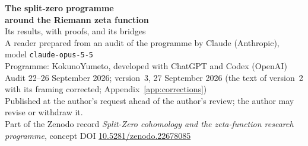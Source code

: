 \documentclass[11pt,a4paper]{article}
\theoremstyle{plain}
\theoremstyle{definition}
\theoremstyle{remark}
\begin{document}
\thispagestyle{plain}
\begin{center}
{\LARGE\bfseries The split-zero programme\\[2pt] around the Riemann zeta function}\\[8pt]
{\Large Its results, with proofs, and its bridges}\\[14pt]
{\large A reader prepared from an audit of the programme by Claude (Anthropic),\\ model \texttt{claude-opus-5-5}}\\[8pt]
{\normalsize Programme: KokunoYumeto, developed with ChatGPT and Codex (OpenAI)}\\[4pt]
{\normalsize Audit 22--26 September 2026; version~3, 27 September 2026 (the text of version~2 with its framing corrected; Appendix~\ref{app:corrections})}\\[4pt]
{\small Published at the author's request ahead of the author's review; the author may revise or withdraw it.}\\[2pt]
{\small Part of the Zenodo record \emph{Split-Zero cohomology and the zeta-function research programme}, concept DOI \href{https://doi.org/10.5281/zenodo.22678085}{10.5281/zenodo.22678085}}
\end{center}



\tableofcontents
\clearpage










\appendix




\end{document}
